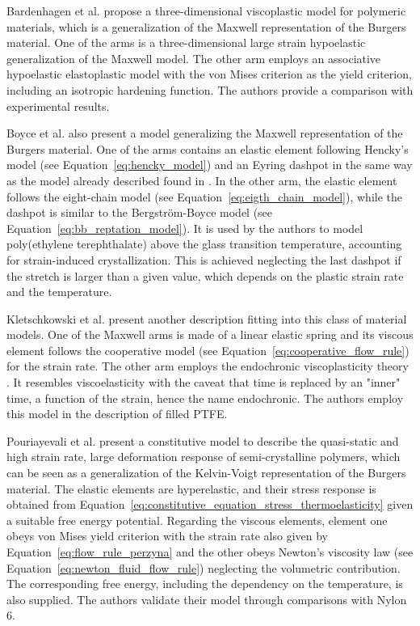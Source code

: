 Bardenhagen et al. \citep{bardenhagenThreedimensionalFiniteDeformation1997} propose a three-dimensional viscoplastic model for polymeric materials, which is a generalization of the Maxwell representation of the Burgers material.
One of the arms is a three-dimensional large strain hypoelastic generalization of the Maxwell model.
The other arm employs an associative hypoelastic elastoplastic model with the von Mises criterion as the yield criterion, including an isotropic hardening function.
The authors provide a comparison with experimental results.

Boyce et al. \citep{boyceConstitutiveModelFinite2000} also present a model generalizing the Maxwell representation of the Burgers material.
One of the arms contains an elastic element following Hencky's model (see Equation~\eqref{eq:hencky_model}) and an Eyring dashpot in the same way as the model already described found in \citep{boyceLargeInelasticDeformation1988}.
In the other arm, the elastic element follows the eight-chain model (see Equation~\eqref{eq:eigth_chain_model}), while the dashpot is similar to the Bergström-Boyce model (see Equation~\eqref{eq:bb_reptation_model}).
It is used by the authors to model poly(ethylene terephthalate) above the glass transition temperature, accounting for strain-induced crystallization.
This is achieved neglecting the last dashpot if the stretch is larger than a given value, which depends on the plastic strain rate and the temperature.

Kletschkowski et al. \citep{kletschkowskiEndochronicViscoplasticMaterial2002} present another description fitting into this class of material models.
One of the Maxwell arms is made of a linear elastic spring and its viscous element follows the cooperative model (see Equation~\eqref{eq:cooperative_flow_rule}) for the strain rate.
The other arm employs the endochronic viscoplasticity theory \citep{valanisTheoryViscoplasticityYield1970}.
It resembles viscoelasticity with the caveat that time is replaced by an "inner" time, a function of the strain, hence the name endochronic.
The authors employ this model in the description of filled PTFE.

Pouriayevali et al. \citep{pouriayevaliConstitutiveDescriptionRatesensitive2013} present a constitutive model to describe the quasi-static and high strain rate, large deformation response of semi-crystalline polymers, which can be seen as a generalization of the Kelvin-Voigt representation of the Burgers material.
The elastic elements are hyperelastic, and their stress response is obtained from Equation~\eqref{eq:constitutive_equation_stress_thermoelasticity} given a suitable free energy potential.
Regarding the viscous elements, element one obeys von Mises yield criterion with the strain rate also given by Equation~\eqref{eq:flow_rule_perzyna} and the other obeys Newton's viscosity law (see Equation~\eqref{eq:newton_fluid_flow_rule}) neglecting the volumetric contribution.
The corresponding free energy, including the dependency on the temperature, is also supplied.
The authors validate their model through comparisons with Nylon 6.

